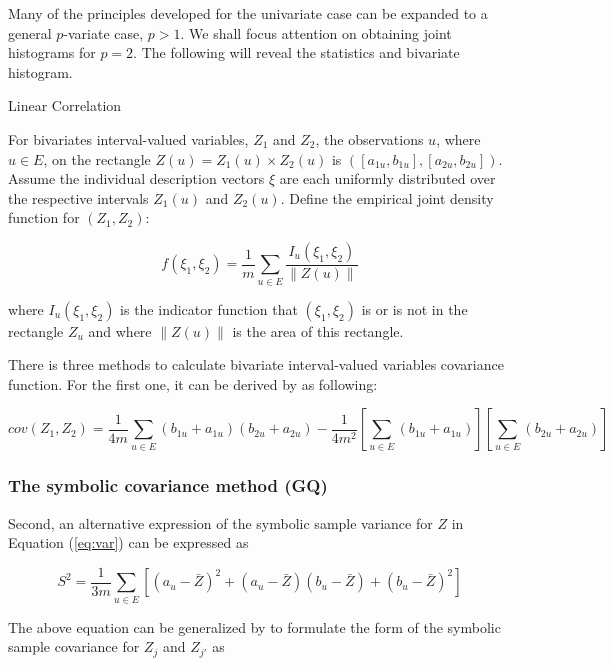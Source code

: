 \documentclass[article]{jss}
\begin{document}
\begin{CodeChunk}
Many of the principles developed for the univariate case can be expanded to a general $p$-variate case, $p > 1$. We shall focus attention on obtaining joint histograms for $p = 2$. The following will reveal the statistics and bivariate histogram.

Linear Correlation

For bivariates interval-valued variables, $Z_1$ and $Z_2$, the observations $u$, where $u \in E$, on the rectangle $Z(u) = Z_1(u) \times Z_2(u)$ is $([a_{1u}, b_{1u}], [a_{2u}, b_{2u}])$. Assume the individual description vectors $\xi$ are each uniformly distributed over the respective intervals $Z_1(u)$ and $Z_2(u)$.  Define the empirical joint density function for $(Z_1, Z_2)$:

\begin{equation}\label{eq:bi_density}
f(\xi_1,\xi_2)=\frac{1}{m}\sum_{u \in E}\frac{I_u(\xi_1,\xi_2)}{\| Z(u) \|}
\end{equation}

where $I_u(\xi_1,\xi_2)$ is the indicator function that $(\xi_1,\xi_2)$ is or is not in the rectangle $Z_u$ and where $\|Z(u)\|$ is the area of this rectangle.

There is three methods to calculate bivariate interval-valued variables covariance function. For the first one, it can be derived by \cite{billard:2003} as following:

\begin{equation}\label{eq:cov}
cov(Z_1,Z_2)=\frac{1}{4m}\sum_{u \in E}(b_{1u} + a_{1u})(b_{2u} + a_{2u})-\frac{1}{4m^2}\left[ \sum_{u \in E}(b_{1u} + a_{1u}) \right]\left[ \sum_{u \in E}(b_{2u} + a_{2u}) \right]
\end{equation}




\subsubsection{The symbolic covariance method (GQ)}
Second, an alternative expression of the symbolic sample variance for $Z$ in Equation (\ref{eq:var}) can be expressed as

\[
S^2 = \frac{1}{3m}\sum_{u \in E}\left[  (a_u-\bar{Z})^2 +(a_u-\bar{Z})(b_u-\bar{Z})+(b_u-\bar{Z})^2 \right]
\]

The above equation can be generalized by \cite{Billard+Diday:2007} to formulate the form of the symbolic sample covariance for $Z_j$ and $Z_{j\prime}$ as


\end{CodeChunk}
\end{document}
